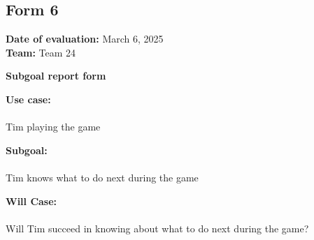 \documentclass[12pt, titlepage]{article}
\begin{document}
\subsection{Form 6}

\noindent \textbf{Date of evaluation:} March 6, 2025\\
\textbf{Team:} Team 24

\vspace{0.5cm}
\noindent \textbf{\large Subgoal report form}

\vspace{0.3cm}
\noindent \textbf{Use case:} \\\\
Tim playing the game


\vspace{0.5cm}
\noindent \textbf{Subgoal:} \\\\
Tim knows what to do next during the game

\vspace{0.5cm}
\noindent \textbf{Will Case:} \\\\
Will Tim succeed in knowing about what to do next during the game?
\end{document}
